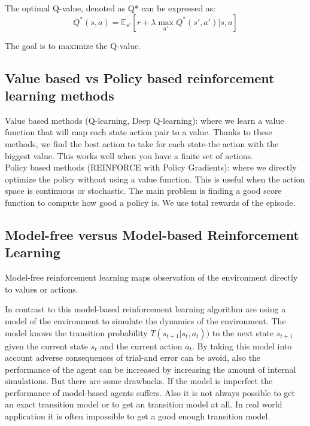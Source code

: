 The optimal Q-value, denoted as Q* can be expressed as:
\begin{equation}
Q^* (s, a) = \mathbb{E}_{s'} [r + \lambda \max_{a'} Q^*(s', a') | s, a]
\end{equation}

The goal is to maximize the Q-value.

\subsection{Value based vs Policy based reinforcement learning methods}

Value based methods (Q-learning, Deep Q-learning): where we learn a value function that will map each state action pair to a value. Thanks to these methods, we find the best action to take for each state-the action with the biggest value. This works well when you have a finite set of actions.\\

Policy based methods (REINFORCE with Policy Gradients): where we directly optimize the policy without using a value function. This is useful when the action space is continuous or stochastic. The main problem is finding a good score function to compute how good a policy is. We use total rewards of the episode.

\subsection{Model-free versus Model-based Reinforcement Learning}

Model-free reinforcement learning maps observation of the environment directly to values or actions.

In contrast to this model-based reinforcement learning algorithm are using a model of the environment to simulate the dynamics of the environment. The model knows the transition probability $T(s_{t+1} | s_t, a_t))$ to the next state $s_{t+1}$ given the current state $s_t$ and the current action $a_t$. By taking this model into account adverse consequences of trial-and error can be avoid, also the performance of the agent can be increased by increasing the amount of internal simulations.
But there are some drawbacks. If the model is imperfect the performance of model-based agents suffers. Also it is not always possible to get an exact transition model or to get an transition model at all. In real world application it is often impossible to get a good enough transition model.\\


